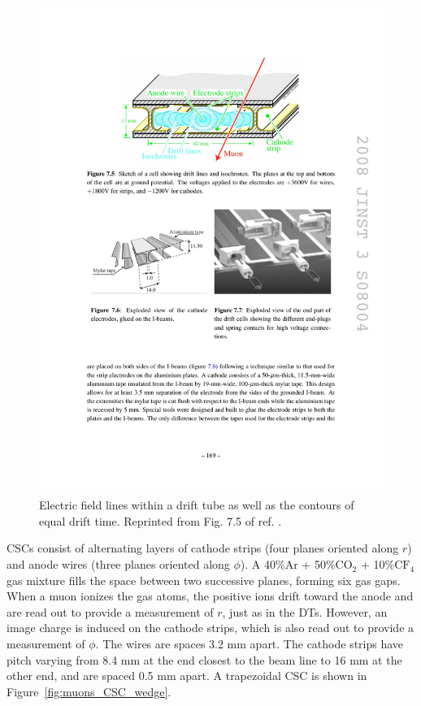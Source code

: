 \documentclass[dissertation.tex]{subfiles}
\begin{document}
\begin{figure}
	\centering
	\includegraphics[scale=1.0]{muons_DT}
	\caption{Electric field lines within a drift tube as well as the contours of equal drift time.  Reprinted from Fig. 7.5 of ref. \cite{1748-0221-3-08-S08004}.}
	\label{fig:muons_DT}
\end{figure}

CSCs consist of alternating layers of cathode strips (four planes oriented along $r$) and anode wires (three planes oriented along $\phi$).  A 40\%Ar + 50\%$\mbox{CO}_{2}$ + 10\%$\mbox{CF}_{4}$ gas mixture fills the space between two successive planes, forming six gas gaps.  When a muon ionizes the gas atoms, the positive ions drift toward the anode and are read out to provide a measurement of $r$, just as in the DTs.  However, an image charge is induced on the cathode strips, which is also read out to provide a measurement of $\phi$.  The wires are spaces 3.2 mm apart.  The cathode strips have pitch varying from 8.4 mm at the end closest to the beam line to 16 mm at the other end, and are spaced 0.5 mm apart.  A trapezoidal CSC is shown in Figure~\ref{fig:muons_CSC_wedge}.
\end{document}
